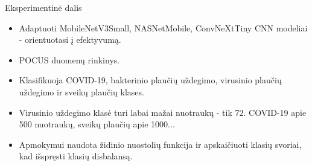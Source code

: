 \documentclass{VUMIFSlides}
\begin{document}
\begin{frame}[c]{Eksperimentinė dalis}    
    \begin{itemize}
        \item  Adaptuoti MobileNetV3Small, NASNetMobile, ConvNeXtTiny  CNN modeliai - orientuotasi į efektyvumą.
        \item  POCUS duomenų rinkinys.
        \item  Klasifikuoja COVID-19, bakterinio plaučių uždegimo, virusinio plaučių uždegimo ir sveikų plaučių klases.
        \item  Virusinio uždegimo klasė turi labai mažai nuotraukų - tik 72. COVID-19 apie 500 nuotraukų, sveikų plaučių apie 1000...
        \item  Apmokymui naudota židinio nuostolių funkcija ir apskaičiuoti klasių svoriai, kad išspręsti klasių disbalansą. 
    \end{itemize}
\end{frame}
\end{document}
